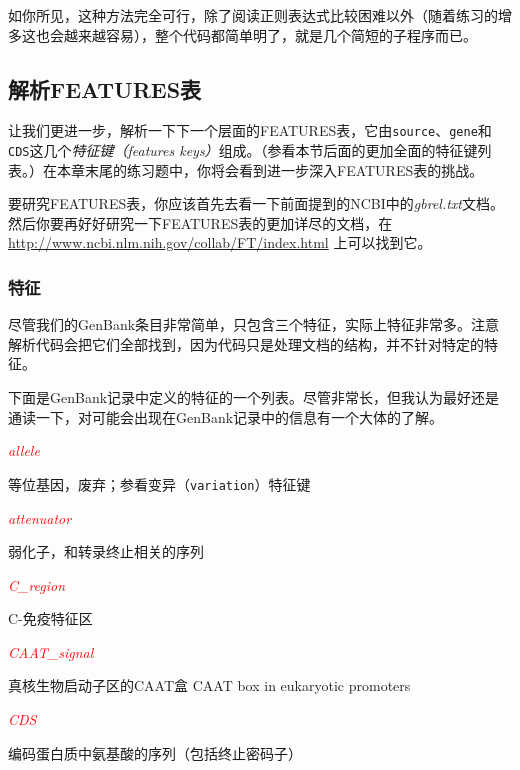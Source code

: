 如你所见，这种方法完全可行，除了阅读正则表达式比较困难以外（随着练习的增多这也会越来越容易），整个代码都简单明了，就是几个简短的子程序而已。

\subsection{解析FEATURES表}
让我们更进一步，解析一下下一个层面的FEATURES表，它由\verb|source|、\verb|gene|和\verb|CDS|这几个\textit{特征键（features keys）}组成。（参看本节后面的更加全面的特征键列表。）在本章末尾的练习题中，你将会看到进一步深入FEATURES表的挑战。

要研究FEATURES表，你应该首先去看一下前面提到的NCBI中的\textit{gbrel.txt}文档。然后你要再好好研究一下FEATURES表的更加详尽的文档，在 \href{http://www.ncbi.nlm.nih.gov/collab/FT/index.html}{http://www.ncbi.nlm.nih.gov/collab/FT/index.html} 上可以找到它。

\subsubsection{特征}
尽管我们的GenBank条目非常简单，只包含三个特征，实际上特征非常多。注意解析代码会把它们全部找到，因为代码只是处理文档的结构，并不针对特定的特征。

下面是GenBank记录中定义的特征的一个列表。尽管非常长，但我认为最好还是通读一下，对可能会出现在GenBank记录中的信息有一个大体的了解。

\textcolor{red}{\textit{allele}}
\begin{adjustwidth}{1cm}{}
等位基因，废弃；参看变异（\verb|variation|）特征键
\end{adjustwidth}

\textcolor{red}{\textit{attenuator}}
\begin{adjustwidth}{1cm}{}
弱化子，和转录终止相关的序列
\end{adjustwidth}

\textcolor{red}{\textit{C\_region}}
\begin{adjustwidth}{1cm}{}
C-免疫特征区
\end{adjustwidth}

\textcolor{red}{\textit{CAAT\_signal}}
\begin{adjustwidth}{1cm}{}
真核生物启动子区的CAAT盒
CAAT box in eukaryotic promoters
\end{adjustwidth}

\textcolor{red}{\textit{CDS}}
\begin{adjustwidth}{1cm}{}
编码蛋白质中氨基酸的序列（包括终止密码子）
\end{adjustwidth}

